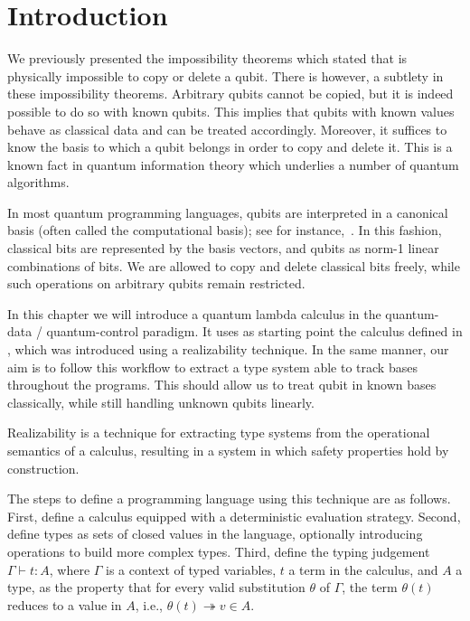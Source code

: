 \section{Introduction}

We previously presented the impossibility theorems which stated that is physically impossible to copy or delete a qubit. There is however, a subtlety in these impossibility theorems. Arbitrary qubits cannot be copied, but it is indeed possible to do so with known qubits. This implies that qubits with known values
behave as classical data and can be treated accordingly. Moreover, it suffices to know the basis to which a qubit belongs in order to copy and delete it. This is a known fact in quantum information theory which underlies a number of quantum algorithms. 

In most quantum programming languages, qubits are interpreted in a canonical basis (often called the computational basis); see for instance,~\cite{10.1145/3093333.3009894,Green_2013,Selinger_2005,Diaz_Caro_2019}. In this fashion, classical bits are represented by the basis vectors, and qubits as norm-1 linear combinations of bits. We are allowed to copy and delete classical bits freely, while such operations on arbitrary qubits remain restricted.

In this chapter we will introduce a quantum lambda calculus in the quantum-data / quantum-control paradigm. It uses as starting point the calculus defined in \cite{DiazcaroGuillermoMiquelValironLICS19}, which was introduced using a realizability technique. In the same manner, our aim is to follow this workflow to extract a type system able to track bases throughout the programs. This should allow us to treat qubit in known bases classically, while still handling unknown qubits linearly.


Realizability is a technique for extracting type systems from the operational semantics of a calculus, resulting in a system in which safety properties hold by construction.

The steps to define a programming language using this technique are as follows. First, define a calculus equipped with a deterministic evaluation strategy. Second, define types as sets of closed values in the language, optionally introducing operations to build more complex types. Third, define the typing judgement $\Gamma \vdash t : A$, where $\Gamma$ is a context of typed variables, $t$ a term in the calculus, and $A$ a type, as the property that for every valid substitution $\theta$ of $\Gamma$, the term $\theta(t)$ reduces to a value in $A$, i.e., $\theta(t) \twoheadrightarrow v \in A$.

